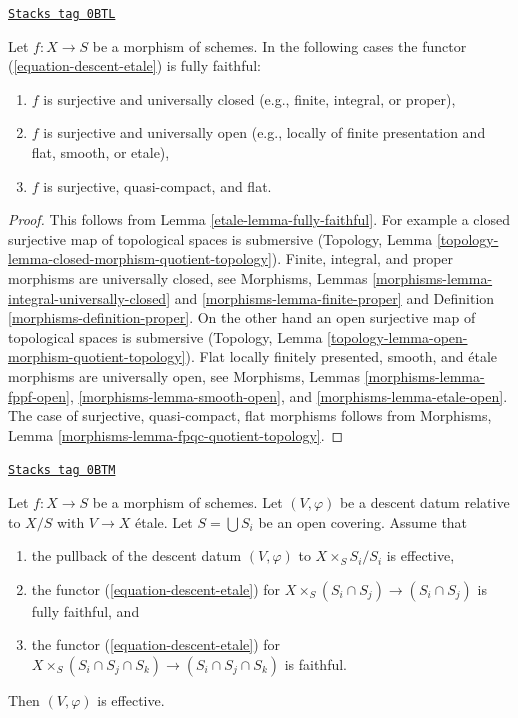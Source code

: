 \begin{lemma}
\label{etale-lemma-fully-faithful-cases}
\href{https://stacks.math.columbia.edu/tag/0BTL}{\texttt{Stacks tag 0BTL}}

Let $f : X \to S$ be a morphism of schemes. In the following
cases the functor (\ref{equation-descent-etale}) is fully faithful:
\begin{enumerate}
\item $f$ is surjective and universally closed
(e.g., finite, integral, or proper),
\item $f$ is surjective and universally open
(e.g., locally of finite presentation and flat, smooth, or etale),
\item $f$ is surjective, quasi-compact, and flat.
\end{enumerate}
\end{lemma}

\begin{proof}

This follows from Lemma \ref{etale-lemma-fully-faithful}.
For example a closed surjective map of topological spaces
is submersive (Topology, Lemma
\ref{topology-lemma-closed-morphism-quotient-topology}).
Finite, integral, and proper morphisms are universally closed, see
Morphisms, Lemmas \ref{morphisms-lemma-integral-universally-closed} and
\ref{morphisms-lemma-finite-proper} and
Definition \ref{morphisms-definition-proper}.
On the other hand an open surjective map of topological spaces
is submersive (Topology, Lemma
\ref{topology-lemma-open-morphism-quotient-topology}).
Flat locally finitely presented, smooth, and \'etale morphisms are
universally open, see
Morphisms, Lemmas \ref{morphisms-lemma-fppf-open},
\ref{morphisms-lemma-smooth-open}, and
\ref{morphisms-lemma-etale-open}.
The case of surjective, quasi-compact, flat morphisms follows
from Morphisms, Lemma \ref{morphisms-lemma-fpqc-quotient-topology}.
\end{proof}

\begin{lemma}
\label{etale-lemma-reduce-to-affine}
\href{https://stacks.math.columbia.edu/tag/0BTM}{\texttt{Stacks tag 0BTM}}

Let $f : X \to S$ be a morphism of schemes.
Let $(V, \varphi)$ be a descent datum relative to $X/S$
with $V \to X$ \'etale. Let $S = \bigcup S_i$ be an
open covering. Assume that
\begin{enumerate}
\item the pullback of the descent datum $(V, \varphi)$
to $X \times_S S_i/S_i$ is effective,
\item the functor (\ref{equation-descent-etale})
for $X \times_S (S_i \cap S_j) \to (S_i \cap S_j)$ is fully faithful, and
\item the functor (\ref{equation-descent-etale})
for $X \times_S (S_i \cap S_j \cap S_k) \to (S_i \cap S_j \cap S_k)$
is faithful.
\end{enumerate}
Then $(V, \varphi)$ is effective.
\end{lemma}

